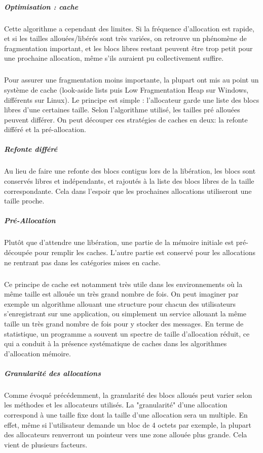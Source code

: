 \subparagraph{Optimisation : cache}
Cette algorithme a cependant des limites. Si la fréquence d'allocation est rapide, et si les tailles allouées/libérés sont très variées, on retrouve un phénomène de
fragmentation important, et les blocs libres restant peuvent être trop petit pour une prochaine allocation, même s'ils auraient pu collectivement suffire.
\subparagraph{}
Pour assurer une fragmentation moins importante, la plupart ont mis au point un système de cache (look-aside lists puis Low Fragmentation Heap sur Windows, différents sur Linux).
Le principe est simple : l'allocateur garde une liste des blocs libres d'une certaines taille. Selon l'algorithme utilisé, les tailles pré allouées peuvent différer.
On peut découper ces stratégies de caches en deux: la refonte différé et la pré-allocation.

\subparagraph{Refonte différé}
Au lieu de faire une refonte des blocs contigus lors de la libération, les blocs sont conservés libres et indépendants, et rajoutés à la liste des blocs libres de
la taille correspondante. Cela dans l'espoir que les prochaines allocations utiliseront une taille proche.

\subparagraph{Pré-Allocation}
Plutôt que d'attendre une libération, une partie de la mémoire initiale est pré-découpée pour remplir les caches. L'autre partie est conservé pour les allocations
ne rentrant pas dans les catégories mises en cache.

\subparagraph{}
Ce principe de cache est notamment très utile dans les environnements où la même taille est allouée un très grand nombre de fois. On peut imaginer par exemple un
algorithme allouant une structure pour chacun des utilisateurs s'enregistrant sur une application, ou simplement un service allouant la même taille un très grand nombre
de fois pour y stocker des messages. En terme de statistique, un programme a souvent un spectre de taille d'allocation réduit, ce qui a conduit à la présence systématique de
caches dans les algorithmes d'allocation mémoire.


\subparagraph{Granularité des allocations}
Comme évoqué précédemment, la granularité des blocs alloués peut varier selon les méthodes et les allocateurs utilisés. La "granularité" d'une allocation
correspond à une taille fixe dont la taille d'une allocation sera un multiple. En effet, même si l'utilisateur demande un bloc de 4 octets par exemple, la plupart
des allocateurs renverront un pointeur vers une zone allouée plus grande. Cela vient de plusieurs facteurs.

